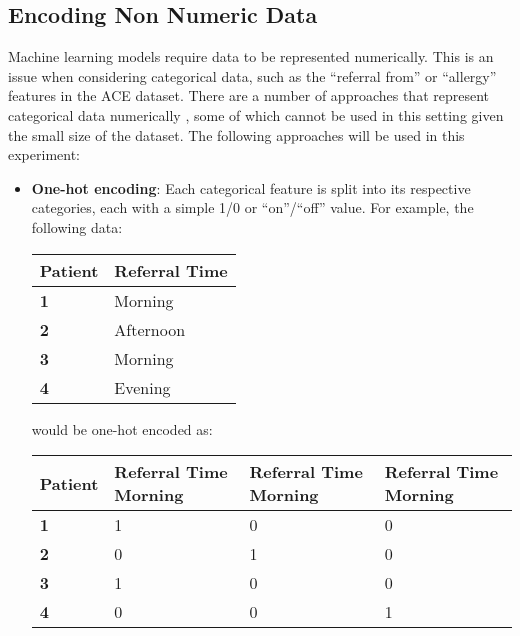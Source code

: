 \subsection{Encoding Non Numeric Data}\label{subsec:encoding-non-numeric-data}

Machine learning models require data to be represented numerically. This is an issue when considering categorical data, such as the ``referral from'' or ``allergy'' features in the ACE dataset. There are a number of approaches that represent categorical data numerically \cite{catenc1} \cite{catenc2}, some of which cannot be used in this setting given the small size of the dataset. The following approaches will be used in this experiment:

\begin{itemize}
    \item \textbf{One-hot encoding}: Each categorical feature is split into its respective categories, each with a simple 1/0 or ``on''/``off'' value. For example, the following data:

    \begin{table}[H]
        \centering
        \begin{tabular}[h]{ P{17mm} P{20mm} }
            \toprule
            \textbf{Patient} & \textbf{Referral Time} \\
            \toprule
            \textbf 1 & Morning \\
            \textbf 2 & Afternoon \\
            \textbf 3 & Morning \\
            \textbf 4 & Evening \\
            \toprule
        \end{tabular}\label{tab:ohetab1}
    \end{table}

    would be one-hot encoded as:

    \begin{table}[H]
        \centering
        \begin{tabular}[h]{P{17mm} P{20mm} P{20mm} P{20mm} }
            \toprule
            \textbf{Patient} & \textbf{Referral Time Morning} & \textbf{Referral Time Morning} & \textbf{Referral Time Morning} \\
            \toprule
            \textbf 1 & 1 & 0 & 0 \\
            \textbf 2 & 0 & 1 & 0 \\
            \textbf 3 & 1 & 0 & 0 \\
            \textbf 4 & 0 & 0 & 1 \\
            \toprule
        \end{tabular}\label{tab:ohetab2}
    \end{table}


\end{itemize}
